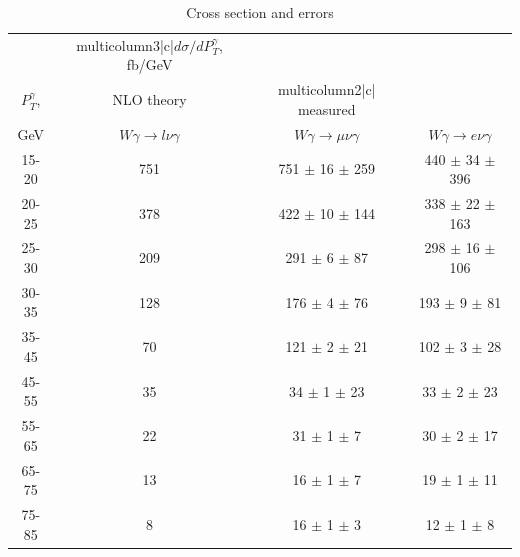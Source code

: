 \begin{table}[h]
  \scriptsize
  \begin{center}
  \caption{Cross section and errors}
  \begin{tabular}{|c|c|c|c|}
                     & multicolumn{3}{|c|}{$d\sigma/dP_{T}^{\gamma}$, fb/GeV} \\ 
     $P_T^{\gamma}$, & NLO theory                          &  multicolumn{2}{|c|}   measured      \\
    GeV              &  $W\gamma\rightarrow l\nu\gamma$ & $W\gamma\rightarrow \mu\nu\gamma$  & $W\gamma\rightarrow e\nu\gamma$    \\ \hline
    15-20 & 751 & 751 $\pm$ 16 $\pm$ 259 & 440 $\pm$ 34 $\pm$ 396 &  \\ \hline
    20-25 & 378 & 422 $\pm$ 10 $\pm$ 144 & 338 $\pm$ 22 $\pm$ 163 &  \\ \hline
    25-30 & 209 & 291 $\pm$ 6 $\pm$ 87 & 298 $\pm$ 16 $\pm$ 106 &  \\ \hline
    30-35 & 128 & 176 $\pm$ 4 $\pm$ 76 & 193 $\pm$ 9 $\pm$ 81 &  \\ \hline
    35-45 & 70 & 121 $\pm$ 2 $\pm$ 21 & 102 $\pm$ 3 $\pm$ 28 &  \\ \hline
    45-55 & 35 & 34 $\pm$ 1 $\pm$ 23 & 33 $\pm$ 2 $\pm$ 23 &  \\ \hline
    55-65 & 22 & 31 $\pm$ 1 $\pm$ 7 & 30 $\pm$ 2 $\pm$ 17 &  \\ \hline
    65-75 & 13 & 16 $\pm$ 1 $\pm$ 7 & 19 $\pm$ 1 $\pm$ 11 &  \\ \hline
    75-85 & 8 & 16 $\pm$ 1 $\pm$ 3 & 12 $\pm$ 1 $\pm$ 8 &  \\ \hline

  \end{tabular}
  \label{tab:sc_mc_vs_meas_}
  \end{center}
\end{table}

